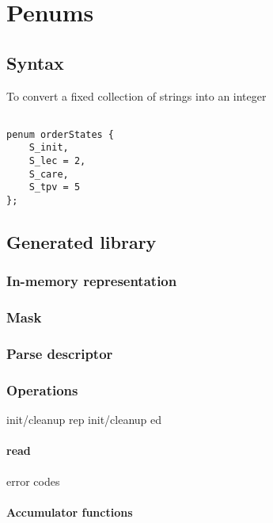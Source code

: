 \chapter{Penums}
\label{chap:enums}
\section{Syntax}
To convert a fixed collection of strings into an integer
\begin{verbatim}

penum orderStates {
    S_init,
    S_lec = 2,
    S_care,
    S_tpv = 5
};

\end{verbatim}


\section{Generated library}
\subsection{In-memory representation}
\label{sec:enums-rep}
\subsection{Mask}
\label{sec:enums-masks}
\subsection{Parse descriptor}
\label{sec:enums-parse-descriptors}

\subsection{Operations}
init/cleanup rep
init/cleanup ed
\subsubsection{read}
  error codes
\subsubsection{Accumulator functions}

